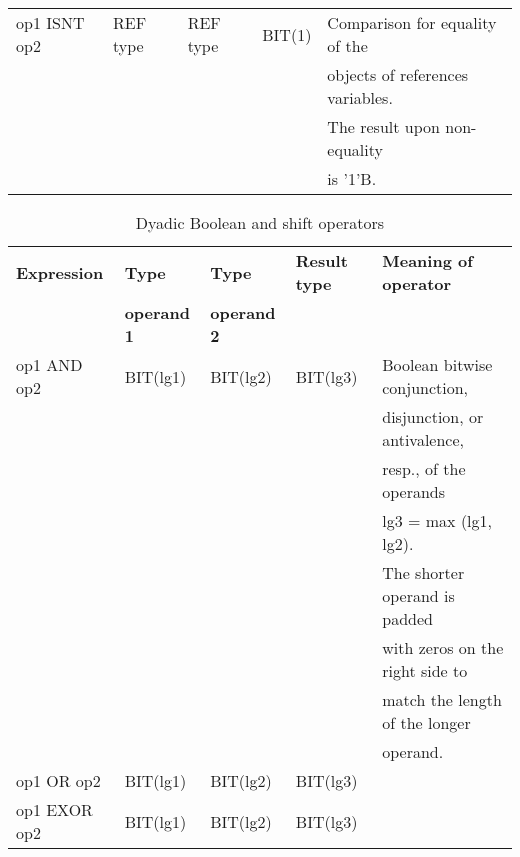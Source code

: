 \begin{table}
\begin{center}
\begin{tabular}{|l|l|l|l|l|}
op1 ISNT op2
\index{ISNT@\textbf{ISNT}|textbf}
     & REF type        & REF type        & BIT(1)               & Comparison for equality of the\\
                 &                 &                 &                      & objects of references variables.\\
                 &                 &                 &                      & The result upon non-equality\\
                 &                 &                 &                      & is '1'B.\\
\hline
\end{tabular}
\end{center}
\end{table}

\begin{table} %
\begin{center}
\caption{Dyadic Boolean and shift operators}
\label{tab_dyadic_boolean_shift}
\vspace{5mm}
\begin{tabular}{|l|l|l|l|l|}
\hline
{\bf Expression} & {\bf Type}      & {\bf Type}      & {\bf Result type} & {\bf Meaning of operator}\\
                 & {\bf operand 1} & {\bf operand 2} &                   & \\ \hline

op1 AND op2
\index{AND@\textbf{AND}|textbf}
      & BIT(lg1)        & BIT(lg2)        & BIT(lg3)          & Boolean bitwise conjunction,\\  
                 &                 &                 &                   & disjunction, or antivalence,\\
                 &                 &                 &                   & resp., of the operands\\
                 &                 &                 &                   & lg3 = max (lg1, lg2).\\
                 &                 &                 &                   & The shorter operand is padded\\
                 &                 &                 &                   & with zeros on the right side to\\
                 &                 &                 &                   & match the length of the longer\\
                 &                 &                 &                   & operand.\\ \cline{1-4}
op1 OR op2
\index{OR@\textbf{OR}|textbf}
       & BIT(lg1)        & BIT(lg2)        & BIT(lg3)          & \\ \cline{1-4}
op1 EXOR op2
\index{EXOR@\textbf{EXOR}|textbf}
     & BIT(lg1)        & BIT(lg2)        & BIT(lg3)          & \\ \hline


\end{tabular}
\end{center}
\end{table}
